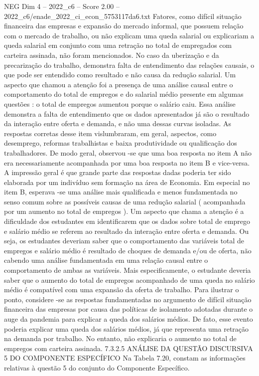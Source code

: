 \begin{textsample}{NEG Dim 4 – 2022\_c6 – Score 2.00 – 2022\_c6/enade\_2022\_ci\_econ\_5753117da6.txt}
Fatores, como difícil situação financeira das empresas e expansão do mercado informal, que possuem relação com o mercado de trabalho, ou não explicam uma queda salarial ou explicariam a queda salarial em conjunto com uma retração no total de empregados com carteira assinada, não foram mencionados.
No caso da uberização e da precarização do trabalho, demonstra falta de entendimento das relações causais, o que pode ser entendido como resultado e não causa da redução salarial.
Um aspecto que chamou a atenção foi a presença de uma análise causal entre o comportamento do total de empregos e do salarial médio presente em algumas questões : o total de empregos aumentou porque o salário caiu.
Essa análise demonstra a falta de entendimento que os dados apresentados já são o resultado da interação entre oferta e demanda, e não uma dessas curvas isoladas.
As respostas corretas desse item vislumbraram, em geral, aspectos, como desemprego, reformas trabalhistas e baixa produtividade ou qualificação dos trabalhadores.
De modo geral, observou -se que uma boa resposta no item A não era necessariamente acompanhada por uma boa resposta no item B e vice-versa.
A impressão geral é que grande parte das respostas dadas poderia ter sido elaborada por um indivíduo sem formação na área de Economia.
Em especial no item B, esperava -se uma análise mais qualificada e menos fundamentada no senso comum sobre as possíveis causas de uma redução salarial ( acompanhada por um aumento no total de empregos ).
Um aspecto que chama a atenção é a dificuldade dos estudantes em identificarem que os dados sobre total de emprego e salário médio se referem ao resultado da interação entre oferta e demanda.
Ou seja, os estudantes deveriam saber que o comportamento das variáveis total de empregos e salário médio é resultado de choques de demanda e/ou de oferta, não cabendo uma análise fundamentada em uma relação causal entre o comportamento de ambas as variáveis.
Mais especificamente, o estudante deveria saber que o aumento do total de empregos acompanhado de uma queda no salário médio é compatível com uma expansão da oferta de trabalho.
Para ilustrar o ponto, considere -se as respostas fundamentadas no argumento de difícil situação financeira das empresas por causa das políticas de isolamento adotadas durante o auge da pandemia para explicar a queda dos salários médios.
De fato, esse evento poderia explicar uma queda dos salários médios, já que representa uma retração na demanda por trabalho.
No entanto, não explicaria o aumento no total de empregos com carteira assinada. 7.3.2.5 ANÁLISE DA QUESTÃO DISCURSIVA 5 DO COMPONENTE ESPECÍFICO Na Tabela 7.20, constam as informações relativas à questão 5 do conjunto do Componente Específico.

\end{textsample}
